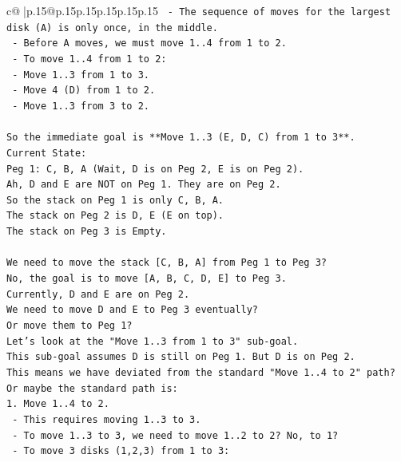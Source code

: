 \documentclass{article}
\begin{document}
{\begin{supertabular}{c@{$\;$}|p{.15\linewidth}@{}p{.15\linewidth}p{.15\linewidth}p{.15\linewidth}p{.15\linewidth}p{.15\linewidth}}
{{{\texttt{     {-} The sequence of moves for the largest disk (A) is only once, in the middle.} \\
\texttt{     {-} Before A moves, we must move 1..4 from 1 to 2.} \\
\texttt{     {-} To move 1..4 from 1 to 2:} \\
\texttt{       {-} Move 1..3 from 1 to 3.} \\
\texttt{       {-} Move 4 (D) from 1 to 2.} \\
\texttt{       {-} Move 1..3 from 3 to 2.} \\
\\ 
\texttt{So the immediate goal is **Move 1..3 (E, D, C) from 1 to 3**.} \\
\texttt{Current State:} \\
\texttt{Peg 1: C, B, A (Wait, D is on Peg 2, E is on Peg 2).} \\
\texttt{Ah, D and E are NOT on Peg 1. They are on Peg 2.} \\
\texttt{So the stack on Peg 1 is only C, B, A.} \\
\texttt{The stack on Peg 2 is D, E (E on top).} \\
\texttt{The stack on Peg 3 is Empty.} \\
\\ 
\texttt{We need to move the stack {[}C, B, A{]} from Peg 1 to Peg 3?} \\
\texttt{No, the goal is to move {[}A, B, C, D, E{]} to Peg 3.} \\
\texttt{Currently, D and E are on Peg 2.} \\
\texttt{We need to move D and E to Peg 3 eventually?} \\
\texttt{Or move them to Peg 1?} \\
\texttt{Let's look at the "Move 1..3 from 1 to 3" sub{-}goal.} \\
\texttt{This sub{-}goal assumes D is still on Peg 1. But D is on Peg 2.} \\
\texttt{This means we have deviated from the standard "Move 1..4 to 2" path?} \\
\texttt{Or maybe the standard path is:} \\
\texttt{1. Move 1..4 to 2.} \\
\texttt{   {-} This requires moving 1..3 to 3.} \\
\texttt{   {-} To move 1..3 to 3, we need to move 1..2 to 2? No, to 1?} \\
\texttt{   {-} To move 3 disks (1,2,3) from 1 to 3:} \\
}}}
\end{supertabular}}
\end{document}
